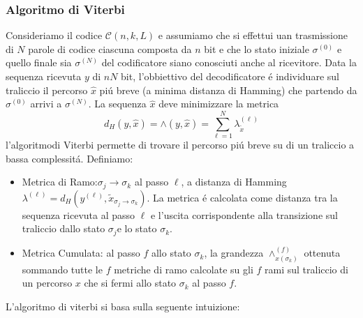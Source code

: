         \subsubsection{Algoritmo di Viterbi}
            Consideriamo il codice  $\mathcal{C}(n,k,L)$ e assumiamo che si effettui uan trasmissione di $N$ parole di codice ciascuna composta da $n$
            bit e che lo stato iniziale $\sigma^{(0)}$ e quello finale sia $\sigma^{(N)}$ del codificatore siano conosciuti anche al ricevitore.
            Data la sequenza ricevuta $y$ di $nN$ bit, l'obbiettivo del decodificatore é individuare sul traliccio il percorso $\hat{x}$ piú breve
            (a minima distanza di Hamming) che partendo da $\sigma^{(0)}$ arrivi a $\sigma^{(N)}$. La sequenza $\hat{x}$ deve minimizzare la metrica 
            \[
                d_H(y,\hat{x}) = \wedge(y,\hat{x}) = \sum_{\ell=1}^{N}\lambda^{(\ell)}_{\tilde{x}}    
            \]
            l'algoritmodi Viterbi permette di trovare il percorso piú breve su di un traliccio a bassa complessitá.
            Definiamo:
            \begin{itemize}
                \item {Metrica di Ramo:$\sigma_j\rightarrow\sigma_k$ al passo $\ell$, a distanza di Hamming
                    $\lambda^{(\ell)}= d_H(y^{(\ell)},\tilde{x}_{\sigma_j\rightarrow\sigma_k})$. La metrica é 
                    calcolata come distanza tra la sequenza ricevuta al passo $\ell$ e l'uscita corrispondente
                    alla transizione sul traliccio dallo stato $\sigma_j$e lo stato $\sigma_k$.
                }
                \item {Metrica Cumulata: al passo $f$ allo stato $\sigma_k$, la grandezza $\wedge_{x(\sigma_k)}^{(f)}$ ottenuta 
                    sommando tutte le $f$ metriche di ramo calcolate su gli $f$ rami sul traliccio di un percorso $x$ che si fermi allo stato 
                    $\sigma_k$ al passo $f$.
                }
            \end{itemize}
            L'algoritmo di viterbi si basa sulla seguente intuizione:

